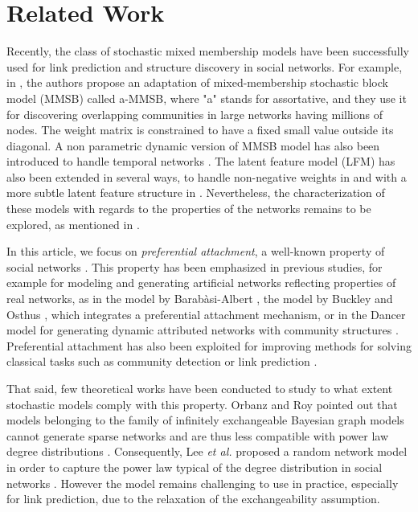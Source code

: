 
\section{Related Work}
\label{sec:rel-work}

Recently,  the class of stochastic mixed membership models have been successfully used for link prediction and structure discovery in social networks. For example, in \cite{gopalan2013efficient}, the authors  propose an adaptation of mixed-membership stochastic block model (MMSB) called a-MMSB, where "a" stands for assortative, and they use it for discovering overlapping communities in large networks having millions of nodes. The weight matrix is constrained to have a fixed small value outside its diagonal. A non parametric dynamic version of MMSB model has also been introduced to  handle temporal networks \cite{fan2015dynamic}. The latent feature model (LFM) has also been extended in several ways, to handle non-negative weights in \cite{morup2011infinite} and with a more subtle latent feature structure in \cite{palla2012infinite}. Nevertheless, the characterization of these models with regards to the properties of the networks remains to be explored, as mentioned in \cite{jacobs2014unified}.

In this article, we focus on \textit{preferential attachment}, a well-known property of social networks \cite{Newman2010, Barabasi2003}. This property has been emphasized in previous studies, for example for modeling and generating artificial networks reflecting properties of real networks, as in the model by Barab\`asi-Albert \cite{albert2002statistical}, the model by Buckley and Osthus \cite{Buckley2001}, which integrates a preferential attachment mechanism, or in the Dancer model for generating dynamic attributed networks with community structures \cite{Largeron2017}. Preferential attachment has also  been exploited for improving methods for solving classical tasks such as community detection \cite{Ciglan2013} or link prediction \cite{Zeng2016}.

That said, few theoretical works have been conducted to study to what extent stochastic models comply with this property.
Orbanz and Roy  pointed out that models belonging to the family of infinitely exchangeable Bayesian graph models cannot generate sparse networks and are thus less compatible with power law degree distributions \cite{orbanz2015bayesian}. Consequently, Lee \textit{et al.}  proposed a random network model in order to capture the power law typical of the degree distribution in social networks \cite{Lee2015}. However the model remains challenging to use in practice, especially for link prediction, due to the relaxation of the exchangeability assumption.~\\

